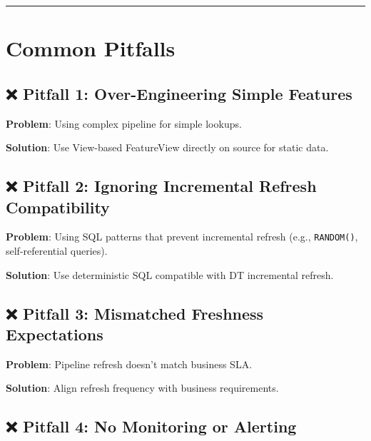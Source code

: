 \documentclass[
  letterpaper,
  DIV=11,
  numbers=noendperiod]{scrreprt}
\begin{document}
\begin{center}\rule{0.5\linewidth}{0.5pt}\end{center}

\hypertarget{common-pitfalls-3}{%
\section{Common Pitfalls}\label{common-pitfalls-3}}

\hypertarget{pitfall-1-over-engineering-simple-features}{%
\subsection{❌ Pitfall 1: Over-Engineering Simple
Features}\label{pitfall-1-over-engineering-simple-features}}

\textbf{Problem}: Using complex pipeline for simple lookups.

\textbf{Solution}: Use View-based FeatureView directly on source for
static data.

\hypertarget{pitfall-2-ignoring-incremental-refresh-compatibility}{%
\subsection{❌ Pitfall 2: Ignoring Incremental Refresh
Compatibility}\label{pitfall-2-ignoring-incremental-refresh-compatibility}}

\textbf{Problem}: Using SQL patterns that prevent incremental refresh
(e.g., \texttt{RANDOM()}, self-referential queries).

\textbf{Solution}: Use deterministic SQL compatible with DT incremental
refresh.

\hypertarget{pitfall-3-mismatched-freshness-expectations}{%
\subsection{❌ Pitfall 3: Mismatched Freshness
Expectations}\label{pitfall-3-mismatched-freshness-expectations}}

\textbf{Problem}: Pipeline refresh doesn't match business SLA.

\textbf{Solution}: Align refresh frequency with business requirements.

\hypertarget{pitfall-4-no-monitoring-or-alerting}{%
\subsection{❌ Pitfall 4: No Monitoring or
Alerting}\label{pitfall-4-no-monitoring-or-alerting}}
\end{document}
